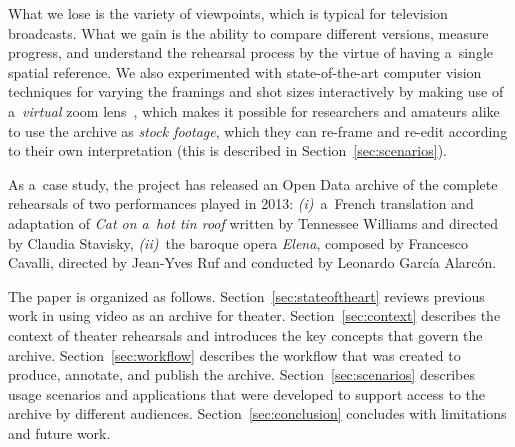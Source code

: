\documentclass[conference]{IEEEtran}
\newcommand{\todo}[1]{\noindent\textcolor{red}{{\bf \{ToDo} #1{\bf \}}}}
\begin{document}



What we lose is the variety of viewpoints, which is typical for television broadcasts. What we gain is the ability to compare different versions, measure progress, and understand the rehearsal process by the virtue of having a~single spatial reference. We also experimented with state-of-the-art computer vision techniques for varying the framings and shot sizes interactively  by making use of a~{\em virtual}  zoom lens~\cite{Gandhi14,Gandhi15}, which makes it possible for researchers and amateurs alike to use the archive as {\em stock footage}, which they can re-frame and re-edit according to their own interpretation (this is described in Section~\ref{sec:scenarios}). 

As a~case study, the project has released an Open Data archive of the complete rehearsals of two performances played in 2013: \emph{(i)}~a~French translation and adaptation of \emph{Cat on a~hot tin roof} written by Tennessee Williams and directed by Claudia Stavisky, \emph{(ii)}~the baroque opera \emph{Elena}, composed by Francesco Cavalli, directed by Jean-Yves Ruf and conducted by Leonardo García Alarcón.



The paper is organized as follows. Section~\ref{sec:stateoftheart} reviews previous work in using video as an archive for theater. Section~\ref{sec:context} describes the context of theater rehearsals and introduces the key concepts that govern the archive. Section~\ref{sec:workflow} describes the workflow that was created to produce, annotate, and publish the archive. Section~\ref{sec:scenarios} describes usage scenarios and applications that were developed to support access to the archive by different audiences. Section~\ref{sec:conclusion} concludes with limitations and future work.
\end{document}
